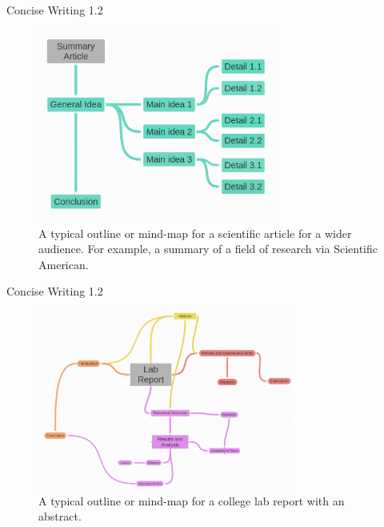 \documentclass{beamer}
\begin{document}
\begin{frame}{Concise Writing 1.2}
\begin{figure}
\centering
\includegraphics[width=0.7\textwidth]{figures/MindMap1.png}
\caption{\label{fig:mm1} A typical outline or mind-map for a scientific article for a wider audience.  For example, a summary of a field of research via Scientific American.}
\end{figure}
\end{frame}

\begin{frame}{Concise Writing 1.2}
\begin{figure}
\centering
\includegraphics[width=0.75\textwidth]{figures/MindMap2.png}
\caption{\label{fig:mm2} A typical outline or mind-map for a college lab report with an abstract.}
\end{figure}
\end{frame}
\end{document}
